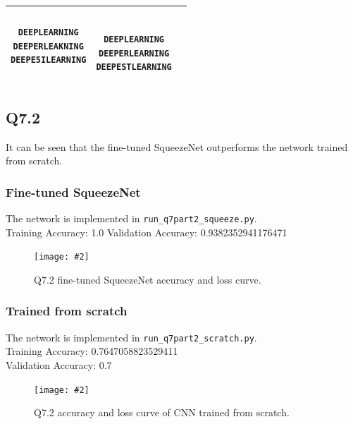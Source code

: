 \documentclass{article} %
\newcommand{\img}[3][0.3]{    
    \begin{figure}[H]
        \centering
        \texttt{[image: \#2]}
        \caption{#3}
    \end{figure}
}
\begin{document}
\begin{tabular}{||c||c|c||}
\begin{minipage}{0.4\textwidth}
\begin{verbatim}
DEEPLEARNING
DEEPERLEAKNING
DEEPE5ILEARNING

\end{verbatim}\end{minipage}
        &
\begin{minipage}{0.4\textwidth}\begin{verbatim}

DEEPLEARNING
DEEPERLEARNING
DEEPESTLEARNING

\end{verbatim}\end{minipage} \\
    \hline\hline
    \end{tabular}

    \subsection*{Q7.2}

    It can be seen that the fine-tuned SqueezeNet outperforms the network trained from scratch.
    \subsubsection*{Fine-tuned SqueezeNet}
    The network is implemented in \verb|run_q7part2_squeeze.py|.\\
    Training Accuracy: 1.0
    Validation Accuracy: 0.9382352941176471

    \img{7part2_1 final.png}{Q7.2 fine-tuned SqueezeNet accuracy and loss curve.}

    \subsubsection*{Trained from scratch}
    The network is implemented in \verb|run_q7part2_scratch.py|.\\
    Training Accuracy: 0.7647058823529411 \\
    Validation Accuracy: 0.7

    \img{7part2_2 final.png}{Q7.2 accuracy and loss curve of CNN trained from scratch.}

    
\end{document}
